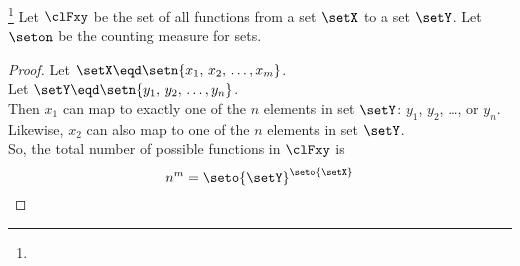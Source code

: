 \begin{proposition}
\footnote{
  }
\label{prop:f_order}
Let $\clFxy$ be the set of all functions from a set $\setX$ to a set $\setY$.
Let $\seton$ be the counting measure for sets.
\end{proposition}
\begin{proof}
Let $\setX\eqd\setn{x_1,\,x_2,\,\ldots,x_m}$.\\
Let $\setY\eqd\setn{y_1,\,y_2,\,\ldots,y_n}$.\\
Then $x_1$ can map to exactly one of the $n$ elements in set $\setY$: $y_1$, $y_2$, \ldots, or $y_n$.\\
Likewise, $x_2$ can also map to one of the $n$ elements in set $\setY$.\\
So, the total number of possible functions in $\clFxy$ is 
\[ n^m = \seto{\setY}^\seto{\setX} \]
\end{proof}


